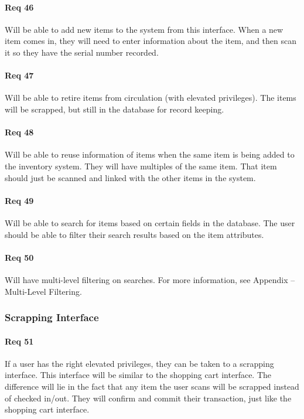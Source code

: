 \documentclass[10pt, onecolumn, twoside, peerreview]{IEEEtran}
\begin{document}
\paragraph*{Req 46} Will be able to add new items to the system from this interface. When a new item comes in, they will need to enter
information about the item, and then scan it so they have the serial number recorded.\\

\paragraph*{Req 47} Will be able to retire items from circulation (with elevated privileges). The items will be scrapped, but still in the
database for record keeping.\\

\paragraph*{Req 48} Will be able to reuse information of items when the same item is being added to the inventory system. They will have
multiples of the same item. That item should just be scanned and linked with the other items in the system.\\

\paragraph*{Req 49} Will be able to search for items based on certain fields in the database. The user should be able to filter their
search results based on the item attributes.\\

\paragraph*{Req 50} Will have multi-level filtering on searches. For more information, see Appendix – Multi-Level Filtering.\\

\subsubsection{Scrapping Interface}
\paragraph*{Req 51} If a user has the right elevated privileges, they can be taken to a scrapping interface. This interface will be similar
to the shopping cart interface. The difference will lie in the fact that any item the user scans will be scrapped
instead of checked in/out. They will confirm and commit their transaction, just like the shopping cart interface.\\
\end{document}
